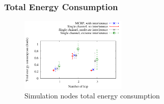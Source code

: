 \subsubsection{Total Energy Consumption}

\begin{figure}
\centering
\includegraphics[width=0.45\textwidth]{figures/totalEnergy.pdf}
\caption{Simulation nodes total energy consumption}
\label{fig:allNodesEnergy}
\end{figure}



